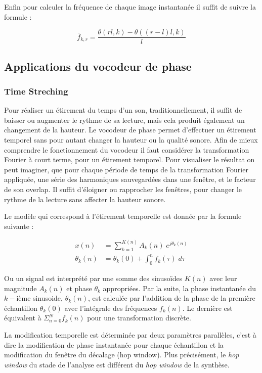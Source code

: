 Enfin pour calculer la fréquence de chaque image instantanée il suffit de suivre la formule :

\begin{equation}
    \bar{f}_{k,r} = \frac{\theta(rl,k) - \theta((r - l )l,k)}{l}
\end{equation}

\subsection{Applications du vocodeur de phase} 

    \subsubsection{Time Streching}

Pour réaliser un étirement du temps d'un son, traditionnellement, il suffit de baisser ou augmenter le rythme de sa lecture, mais cela produit également un changement de la hauteur. Le vocodeur de phase permet d'effectuer un étirement temporel sans pour autant changer la hauteur ou la qualité sonore. Afin de mieux comprendre le fonctionnement du vocodeur il faut considérer la transformation Fourier à court terme, pour un étirement temporel. Pour visualiser le résultat on peut imaginer, que pour chaque période de temps de la transformation Fourier appliquée, une série des harmoniques sauvegardées dans une fenêtre, et le facteur de son overlap. Il suffit d'éloigner ou rapprocher les fenêtres, pour changer le rythme de la lecture sans affecter la hauteur sonore.

Le modèle qui correspond à l'étirement temporelle est donnée par la formule suivante :

    \begin{align}
         x(n) &= \sum_{k=1}^{K(n)} A_k(n) \; e^{j \theta_k (n)} \\
         \theta_k(n) &= \theta_k(0) + \int_{0}^{n} f_k (\tau) \; d\tau
    \end{align}

Ou un signal est interprété par une somme des sinusoïdes $K(n)$ avec leur magnitude $A_k(n)$ et phase $\theta_k$ appropriées. Par la suite, la phase instantanée du $k-$ième sinusoide, $\theta_k(n)$, est calculée par l'addition de la phase de la première échantillon $\theta_k(0)$ avec l'intégrale des fréquences $f_k (n)$. Le dernière est équivalent à $\Sigma_{n=0}^N f_k(n)$ pour une transformation discrète.

La modification temporelle est déterminée par deux paramètres parallèles, c’est à dire la modification de phase instantanée pour chaque échantillon et la modification du fenêtre du décalage (hop window). Plus précisément, le \textit{hop window} du stade de l'analyse est différent du \textit{hop window} de la synthèse.

